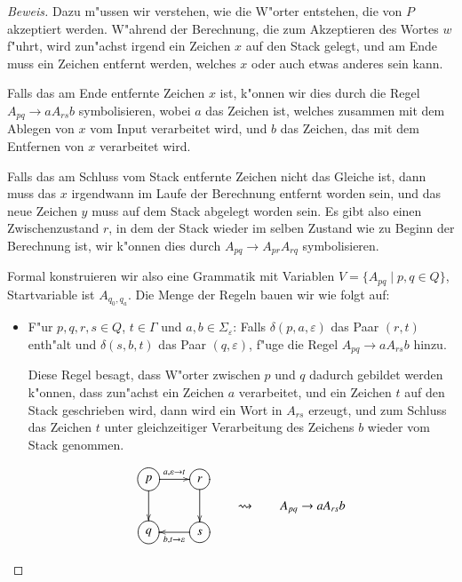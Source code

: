 \begin{proof}[Beweis]
Dazu m"ussen wir verstehen, wie die W"orter entstehen, die von $P$
akzeptiert werden. W"ahrend der Berechnung, die zum Akzeptieren des
Wortes $w$ f"uhrt, wird zun"achst
irgend ein Zeichen $x$ auf den Stack gelegt, und am Ende muss ein
Zeichen entfernt werden, welches $x$ oder auch etwas anderes sein kann.

Falls das am Ende entfernte Zeichen $x$ ist, k"onnen wir dies durch
die Regel $A_{pq}\to aA_{rs}b$ symbolisieren, wobei $a$ das Zeichen
ist, welches zusammen mit dem Ablegen von $x$ vom Input verarbeitet wird,
und $b$ das Zeichen, das mit dem Entfernen von $x$ verarbeitet wird.

Falls das am Schluss vom Stack entfernte Zeichen nicht das Gleiche ist,
dann muss das $x$ irgendwann im Laufe der Berechnung entfernt worden
sein, und das neue Zeichen $y$ muss auf dem Stack abgelegt worden
sein. Es gibt also einen Zwischenzustand $r$, in dem der Stack
wieder im selben Zustand wie zu
Beginn der Berechnung ist, wir k"onnen dies durch
$A_{pq}\to A_{pr}A_{rq}$ symbolisieren.

Formal konstruieren wir also eine Grammatik mit Variablen
$V=\{A_{pq}\;|\; p,q\in Q\}$, Startvariable ist $A_{q_0,q_a}$.
Die Menge der Regeln bauen wir wie folgt auf:
\begin{itemize}
\item F"ur $p,q,r,s\in Q$, $t\in\Gamma$ und $a,b\in\Sigma_{\varepsilon}$:
Falls $\delta(p,a,\varepsilon)$ das Paar $(r,t)$ enth"alt
und $\delta(s,b,t)$ das Paar $(q,\varepsilon)$, f"uge die Regel
$A_{pq}\to aA_{rs}b$ hinzu.

Diese Regel besagt, dass W"orter zwischen $p$ und $q$ dadurch gebildet
werden k"onnen, dass zun"achst ein Zeichen $a$ verarbeitet, und
ein Zeichen $t$ auf den Stack geschrieben wird, dann wird ein Wort
in $A_{rs}$ erzeugt, und zum Schluss das Zeichen $t$ unter
gleichzeitiger Verarbeitung des Zeichens $b$ wieder vom Stack
genommen.

\[
\begin{gathered}
\entrymodifiers={++[o][F]}
\xymatrix{
{p}\ar[d]\ar[r]^{a,\varepsilon\to t}
	&{r}\ar[d]
\\
{q}
	&{s}\ar[l]^{b,t\to\varepsilon}
}
\end{gathered}
\qquad\rightsquigarrow\qquad A_{pq}\to aA_{rs}b
\]


\end{itemize}
\end{proof}
